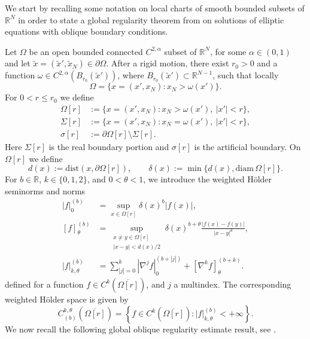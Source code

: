 \documentclass[10pt,a4paper, reqno]{amsart}
\numberwithin{equation}{section}
\newcommand{\R}{\mathbb{R}}
\begin{document}
We start by recalling some notation on local charts of smooth bounded subsets of $\R^N$ in order to state a global regularity theorem from \cite{Lieberman12} on solutions of elliptic equations with oblique boundary  conditions.

Let $\Omega$ be an open bounded connected $C^{2,\alpha}$ subset of $\R^N$, for some $\alpha\in(0,1)$ and let $\tilde{x} = (\tilde{x}',\tilde{x}_N) \in\partial\Omega$. After a rigid motion, there exist $r_0>0$ and a function $\omega\in C^{2,\alpha}(B_{r_0}(\tilde{x}'))$, where $B_{r_0}(\tilde{x}')\subset\R^{N-1}$, such that locally
\[
    \Omega = \{x=(x',x_N) \colon x_N>\omega(x')\}.
\]
For $0<r\le r_0$ we define
\begin{equation*}
\begin{aligned}
\Omega[r]&:=\{x=(x',x_N)\colon x_N > \omega(x'),\ |x'|<r\},\\
\Sigma[r]&:=\{x=(x',x_N)\colon x_N = \omega(x'),\ |x'|<r\},\\
\sigma[r]&:=\partial\Omega[r]\setminus\Sigma[r].
\end{aligned}
\end{equation*}
Here $\Sigma[r]$ is the real boundary portion and $\sigma[r]$ is the artificial boundary. On $\Omega[r]$ we define
\begin{equation}\label{eq d and delta}
    d(x):= \mathrm{dist}(x,\partial \Omega[r]),\qquad \delta(x):= \min \{d(x), \mathrm{diam}\,\Omega[r]\}.
\end{equation}
For $b\in\R$, $k\in \{0,1,2\}$, and $0<\theta<1$, we introduce the weighted H\"older seminorms and norms
\[
\begin{aligned}
    |f|_0^{(b)}&=\sup_{x\in\Omega[r]}\delta(x)^b|f(x)|,\\
    [f]_{\theta}^{(b)}&=
    \sup_{\substack{x\ne y\in\Omega[r]\\ |x-y|<d(x)/2}}
    \delta(x)^{b+\theta}\frac{|f(x)-f(y)|}{|x-y|^{\theta}},\\
    |f|_{k,\theta}^{(b)}&=\sum_{|j|=0}^k |\nabla^j f|_0^{(b+|j|)}+[\nabla^k f]_{\theta}^{(b+k)}.
\end{aligned}    
\]
defined for a function $f \in C^k(\overline{\Omega[r]})$, and $j$ a multindex. The corresponding weighted H\"older space is given by
\[
    C_{(b)}^{k,\theta}(\overline{\Omega[r]})=\left\{ f \in C^k(\overline{\Omega[r]}) \colon |f|_{k,\theta}^{(b)}<+\infty\right\}.
\]
We now recall the following global oblique regularity estimate result, see \cite[Proposition 11.21]{Lieberman12}.
\end{document}
